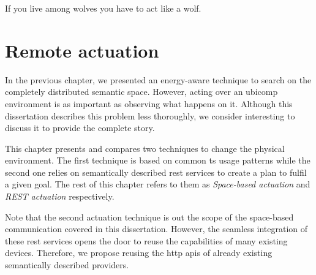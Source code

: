 
\begin{savequote}[50mm]
If you live among wolves you have to act like a wolf.
\end{savequote}


\chapter{Remote actuation}
\label{cha:actuate}


\newcommand{\restdesc}{\emph{RESTdesc}}
\newcommand{\spaceActuation}{\emph{Space-based actuation}}
\newcommand{\restActuation}{\emph{REST actuation}}
\newcommand{\hybridActuation}{\emph{Hybrid actuation}}


\ifpdf
    \graphicspath{{\pathchapsix/figures/PNG/}{\pathchapsix/figures/PDF/}{\pathchapsix/figures/JPG/}{\pathchapsix/figures/}}
\else
    \graphicspath{{\pathchapsix/figures/EPS/}{\pathchapsix/figures/}}
\fi




In the previous chapter, we presented an energy-aware technique to search on the completely distributed semantic space. %
However, acting over an \ac{ubicomp} environment is as important as observing what happens on it.
Although this dissertation describes this problem less thoroughly, we consider interesting to discuss it to provide the complete story. %

\bigskip


This chapter presents and compares two techniques to change the physical environment.
The first technique is based on common \ac{ts} usage patterns while the second one relies on semantically described \ac{rest} services to create a plan to fulfil a given goal.
The rest of this chapter refers to them as \spaceActuation{} and \restActuation{} respectively.

Note that the second actuation technique is out the scope of the space-based communication covered in this dissertation.
However, the seamless integration of these \ac{rest} services opens the door to reuse the capabilities of many existing devices.
Therefore, we propose reusing the \acs{http} \acsp{api} of already existing semantically described providers.

